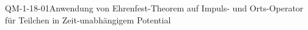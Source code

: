 
\begin{CONC}{QM-1-18-01}{Anwendung von Ehrenfest-Theorem auf Impuls- und Orts-Operator für Teilchen in Zeit-unabhängigem Potential}
\end{CONC}
